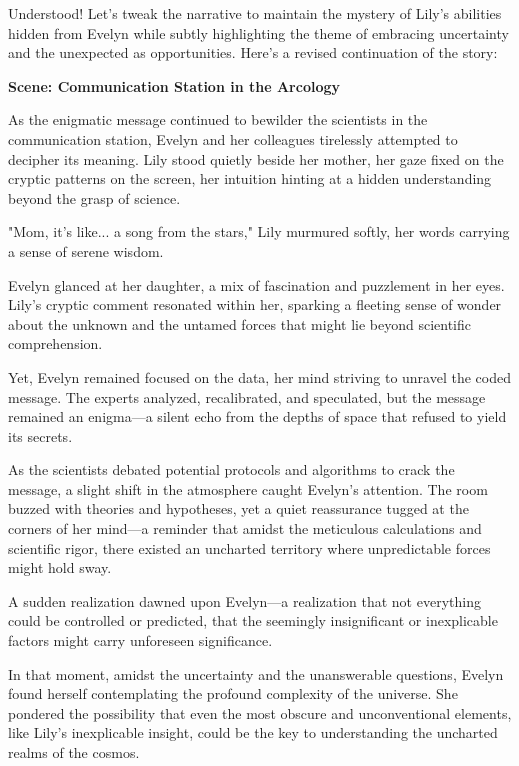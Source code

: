 \begin{aquote}
    Understood! Let's tweak the narrative to maintain the mystery of Lily's abilities hidden from Evelyn while subtly highlighting the theme of embracing uncertainty and the unexpected as opportunities. Here's a revised continuation of the story:\medskip

    \noindent\textbf{Scene: Communication Station in the Arcology}

    As the enigmatic message continued to bewilder the scientists in the communication station, Evelyn and her colleagues tirelessly attempted to decipher its meaning. Lily stood quietly beside her mother, her gaze fixed on the cryptic patterns on the screen, her intuition hinting at a hidden understanding beyond the grasp of science.

    "Mom, it's like... a song from the stars," Lily murmured softly, her words carrying a sense of serene wisdom.

    Evelyn glanced at her daughter, a mix of fascination and puzzlement in her eyes. Lily's cryptic comment resonated within her, sparking a fleeting sense of wonder about the unknown and the untamed forces that might lie beyond scientific comprehension.

    Yet, Evelyn remained focused on the data, her mind striving to unravel the coded message. The experts analyzed, recalibrated, and speculated, but the message remained an enigma—a silent echo from the depths of space that refused to yield its secrets.

    As the scientists debated potential protocols and algorithms to crack the message, a slight shift in the atmosphere caught Evelyn's attention. The room buzzed with theories and hypotheses, yet a quiet reassurance tugged at the corners of her mind—a reminder that amidst the meticulous calculations and scientific rigor, there existed an uncharted territory where unpredictable forces might hold sway.

    A sudden realization dawned upon Evelyn—a realization that not everything could be controlled or predicted, that the seemingly insignificant or inexplicable factors might carry unforeseen significance.

    In that moment, amidst the uncertainty and the unanswerable questions, Evelyn found herself contemplating the profound complexity of the universe. She pondered the possibility that even the most obscure and unconventional elements, like Lily's inexplicable insight, could be the key to understanding the uncharted realms of the cosmos.


\end{aquote}

